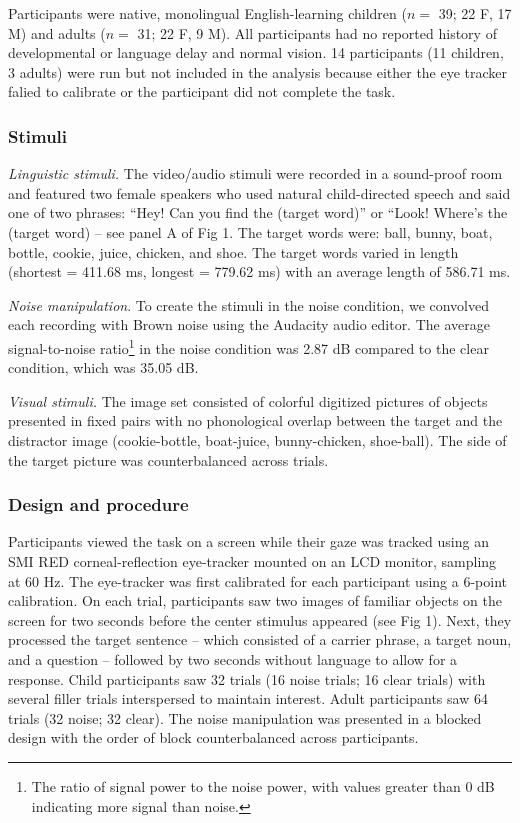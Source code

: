 \documentclass[10pt, letterpaper]{article}
\begin{document}
Participants were native, monolingual English-learning children (\(n=\)
39; 22 F, 17 M) and adults (\(n=\) 31; 22 F, 9 M). All participants had
no reported history of developmental or language delay and normal
vision. 14 participants (11 children, 3 adults) were run but not
included in the analysis because either the eye tracker falied to
calibrate or the participant did not complete the task.

\subsubsection{Stimuli}\label{stimuli}

\emph{Linguistic stimuli.} The video/audio stimuli were recorded in a
sound-proof room and featured two female speakers who used natural
child-directed speech and said one of two phrases: ``Hey! Can you find
the (target word)'' or ``Look! Where's the (target word) -- see panel A
of Fig 1. The target words were: ball, bunny, boat, bottle, cookie,
juice, chicken, and shoe. The target words varied in length (shortest =
411.68 ms, longest = 779.62 ms) with an average length of 586.71 ms.

\emph{Noise manipulation}. To create the stimuli in the noise condition,
we convolved each recording with Brown noise using the Audacity audio
editor. The average signal-to-noise ratio\footnote{The ratio of signal
  power to the noise power, with values greater than 0 dB indicating
  more signal than noise.} in the noise condition was 2.87 dB compared
to the clear condition, which was 35.05 dB.

\emph{Visual stimuli.} The image set consisted of colorful digitized
pictures of objects presented in fixed pairs with no phonological
overlap between the target and the distractor image (cookie-bottle,
boat-juice, bunny-chicken, shoe-ball). The side of the target picture
was counterbalanced across trials.

\subsubsection{Design and procedure}\label{design-and-procedure}

Participants viewed the task on a screen while their gaze was tracked
using an SMI RED corneal-reflection eye-tracker mounted on an LCD
monitor, sampling at 60 Hz. The eye-tracker was first calibrated for
each participant using a 6-point calibration. On each trial,
participants saw two images of familiar objects on the screen for two
seconds before the center stimulus appeared (see Fig 1). Next, they
processed the target sentence -- which consisted of a carrier phrase, a
target noun, and a question -- followed by two seconds without language
to allow for a response. Child participants saw 32 trials (16 noise
trials; 16 clear trials) with several filler trials interspersed to
maintain interest. Adult participants saw 64 trials (32 noise; 32
clear). The noise manipulation was presented in a blocked design with
the order of block counterbalanced across participants.
\end{document}
